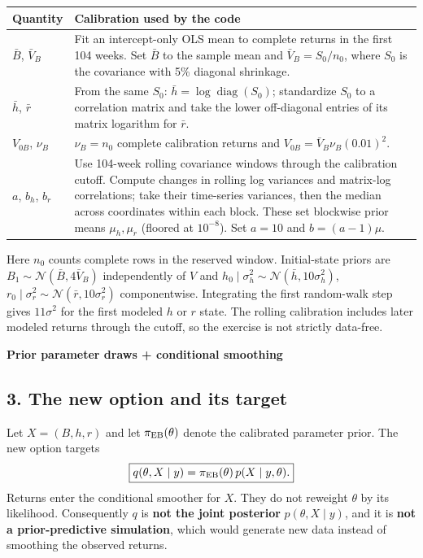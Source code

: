 \documentclass[10pt,a4paper]{article}
\newcommand{\Normal}{\mathcal N}
\begin{document}
\begin{tabularx}{\linewidth}{@{}p{36mm}Y@{}}\toprule
Quantity & Calibration used by the code \\\midrule
$\bar B$, $\bar V_B$ & Fit an intercept-only OLS mean to complete returns in
the first 104 weeks. Set $\bar B$ to the sample mean and $\bar V_B=S_0/n_0$,
where $S_0$ is the covariance with 5\% diagonal shrinkage. \\
$\bar h$, $\bar r$ & From the same $S_0$: $\bar h=\log\operatorname{diag}(S_0)$;
standardize $S_0$ to a correlation matrix and take the lower off-diagonal
entries of its matrix logarithm for $\bar r$. \\
$V_{0B}$, $\nu_B$ & $\nu_B=n_0$ complete calibration returns and
$V_{0B}=\bar V_B\nu_B(0.01)^2$. \\
$a$, $b_h$, $b_r$ & Use 104-week rolling covariance windows through the
calibration cutoff. Compute changes in rolling log variances and matrix-log
correlations; take their time-series variances, then the median across
coordinates within each block. These set blockwise prior means $\mu_h,\mu_r$
(floored at $10^{-8}$). Set $a=10$ and $b=(a-1)\mu$. \\\bottomrule
\end{tabularx}
Here $n_0$ counts complete rows in the reserved window. Initial-state priors
are $B_1\sim\Normal(\bar B,4\bar V_B)$ independently of $V$ and
$h_0\mid\sigma_h^2\sim\Normal(\bar h,10\sigma_h^2)$,
$r_0\mid\sigma_r^2\sim\Normal(\bar r,10\sigma_r^2)$ componentwise.
Integrating the first random-walk step gives $11\sigma^2$ for the first
modeled $h$ or $r$ state. The rolling calibration includes later modeled
returns through the cutoff, so the exercise is not strictly data-free.

\clearpage
{\color{ink}\Large\bfseries Prior parameter draws + conditional smoothing\par}
\subsection*{3. The new option and its target}
Let $X=(B,h,r)$ and let $\pi_{\rm EB}(\theta)$ denote the calibrated parameter
prior. The new option targets
\[
\boxed{q(\theta,X\mid y)=\pi_{\rm EB}(\theta)\,p(X\mid y,\theta).}
\]
Returns enter the conditional smoother for $X$. They do not reweight
$\theta$ by its likelihood. Consequently $q$ is \textbf{not the joint
posterior} $p(\theta,X\mid y)$, and it is \textbf{not a prior-predictive
simulation}, which would generate new data instead of smoothing the observed
returns.
\end{document}
